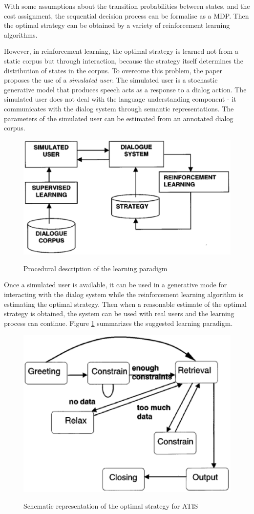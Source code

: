\documentclass[paper=a4, fontsize=18pt]{article} %
\numberwithin{equation}{section} %
\numberwithin{figure}{section} %
\numberwithin{table}{section} %
\begin{document}
With some assumptions about the transition probabilities between states, and the cost assignment, the sequential decision process can be formalise as a MDP. Then the optimal strategy can be obtained by a variety of reinforcement learning algorithms.

However, in reinforcement learning, the optimal strategy is learned not from a static corpus but through interaction, because the strategy itself determines the distribution of states in the corpus. To overcome this problem, the paper proposes the use of a \emph{simulated user}. The simulated user is a stochastic generative model that produces speech acts as a response to a dialog action. The simulated user does not deal with the language understanding component - it communicates with the dialog system through semantic representations. The parameters of the simulated user can be estimated from an annotated dialog corpus.

\begin{figure}[htbp]
  \centering
  \includegraphics[width=.6\linewidth]{10_17_dialog_MDP2}\\
  \caption{Procedural description of the learning paradigm}\label{fig:dialog_MDP2}
\end{figure}

Once a simulated user is available, it can be used in a generative mode for interacting with the dialog system while the reinforcement learning algorithm is estimating the optimal strategy. Then when a reasonable estimate of the optimal strategy is obtained, the system can be used with real users and the learning process can continue. Figure \ref{fig:dialog_MDP2} summarizes the suggested learning paradigm.

\begin{figure}[htbp]
  \centering
  \includegraphics[width=.5\linewidth]{10_17_dialog_MDP3}\\
  \caption{Schematic representation of the optimal strategy for ATIS}\label{fig:dialog_MDP3}
\end{figure}
\end{document}
